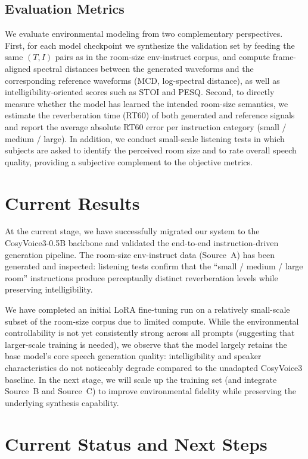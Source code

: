 \documentclass{article}
\begin{document}
\subsection{Evaluation Metrics}

We evaluate environmental modeling from two complementary perspectives. First, for each model checkpoint we synthesize the validation set by feeding the same $(T, I)$ pairs as in the room-size env-instruct corpus, and compute frame-aligned spectral distances between the generated waveforms and the corresponding reference waveforms (MCD, log-spectral distance), as well as intelligibility-oriented scores such as STOI and PESQ. Second, to directly measure whether the model has learned the intended room-size semantics, we estimate the reverberation time (RT60) of both generated and reference signals and report the average absolute RT60 error per instruction category (small / medium / large). In addition, we conduct small-scale listening tests in which subjects are asked to identify the perceived room size and to rate overall speech quality, providing a subjective complement to the objective metrics.

\section{Current Results}

At the current stage, we have successfully migrated our system to the CosyVoice3-0.5B backbone and validated the end-to-end instruction-driven generation pipeline. The room-size env-instruct data (Source~A) has been generated and inspected: listening tests confirm that the ``small / medium / large room'' instructions produce perceptually distinct reverberation levels while preserving intelligibility.

We have completed an initial LoRA fine-tuning run on a relatively small-scale subset of the room-size corpus due to limited compute. While the environmental controllability is not yet consistently strong across all prompts (suggesting that larger-scale training is needed), we observe that the model largely retains the base model's core speech generation quality: intelligibility and speaker characteristics do not noticeably degrade compared to the unadapted CosyVoice3 baseline. In the next stage, we will scale up the training set (and integrate Source~B and Source~C) to improve environmental fidelity while preserving the underlying synthesis capability.


\section{Current Status and Next Steps}
\end{document}
